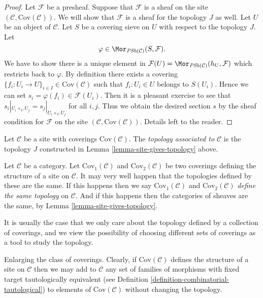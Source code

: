 \begin{proof}
\medskip\noindent
Let $\mathcal{F}$ be a presheaf. Suppose that $\mathcal{F}$
is a sheaf on the site $(\mathcal{C}, \text{Cov}(\mathcal{C}))$.
We will show that $\mathcal{F}$ is a sheaf for the topology $J$
as well. Let $U$ be an object of $\mathcal{C}$. Let
$S$ be a covering sieve on $U$ with respect to the topology $J$.
Let
$$
\varphi \in \Mor_{\textit{PSh}(\mathcal{C})}(S, \mathcal{F}).
$$
We have to show there is a unique element in
$\mathcal{F}(U) = \Mor_{\textit{PSh}(\mathcal{C})}(h_U, \mathcal{F})$
which restricts back to $\varphi$. By definition there exists
a covering $\{f_i : U_i \to U\}_{i\in I} \in \text{Cov}(\mathcal{C})$
such that $f_i : U_i \in U$ belongs to $S(U_i)$.  Hence
we can set $s_i = \varphi(f_i) \in \mathcal{F}(U_i)$.
Then it is a pleasant exercise to see that
$s_i|_{U_i \times_U U_j} = s_j|_{U_i \times_U U_j}$ for all
$i, j$. Thus we obtain the desired section $s$ by the sheaf
condition for $\mathcal{F}$ on the site
$(\mathcal{C}, \text{Cov}(\mathcal{C}))$.
Details left to the reader.
\end{proof}

\begin{definition}
\label{definition-topology-associated-site}
Let $\mathcal{C}$ be a site with coverings $\text{Cov}(\mathcal{C})$.
The {\it topology associated to $\mathcal{C}$} is the topology
$J$ constructed in Lemma \ref{lemma-site-gives-topology} above.
\end{definition}

\noindent
Let $\mathcal{C}$ be a category.
Let $\text{Cov}_1(\mathcal{C})$ and $\text{Cov}_2(\mathcal{C})$
be two coverings defining the structure of a site on $\mathcal{C}$.
It may very well happen that the topologies defined
by these are the same. If this happens
then we say $\text{Cov}_1(\mathcal{C})$ and
$\text{Cov}_2(\mathcal{C})$ {\it define the same topology} on
$\mathcal{C}$. And if this happens then the categories of sheaves
are the same, by Lemma \ref{lemma-site-gives-topology}.

\medskip\noindent
It is usually the case that we only care about the topology defined
by a collection of coverings, and we view the possibility of choosing
different sets of coverings as a tool to study the topology.

\begin{remark}
\label{remark-enlarge-coverings}
Enlarging the class of coverings.
Clearly, if $\text{Cov}(\mathcal{C})$
defines the structure of a site on $\mathcal{C}$ then we may
add to $\mathcal{C}$ any set of families of morphisms with fixed target
tautologically equivalent
(see Definition \ref{definition-combinatorial-tautological})
to elements of $\text{Cov}(\mathcal{C})$ without changing the topology.
\end{remark}

